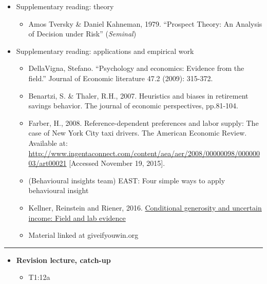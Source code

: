 \documentclass[]{article}
\providecommand{\tightlist}{%
  \setlength{\itemsep}{0pt}\setlength{\parskip}{0pt}}
\begin{document}
\begin{itemize}
\tightlist
\item
  Supplementary reading: theory

  \begin{itemize}
  \tightlist
  \item
    Amos Tversky \& Daniel Kahneman, 1979. ``Prospect Theory: An Analysis of Decision under Risk'' (\emph{Seminal})
  \end{itemize}
\item
  Supplementary reading: applications and empirical work

  \begin{itemize}
  \tightlist
  \item
    DellaVigna, Stefano. ``Psychology and economics: Evidence from the field.'' Journal of Economic literature 47.2 (2009): 315-372.
  \item
    Benartzi, S. \& Thaler, R.H., 2007. Heuristics and biases in retirement savings behavior. The journal of economic perspectives, pp.81-104.
  \item
    Farber, H., 2008. Reference-dependent preferences and labor supply: The case of New York City taxi drivers. The American Economic Review. Available at: \url{http://www.ingentaconnect.com/content/aea/aer/2008/00000098/00000003/art00021} {[}Accessed November 19, 2015{]}.
  \item
    (Behavioural insights team) EAST: Four simple ways to apply behavioural insight
  \item
    Kellner, Reinstein and Riener, 2016. \href{https://dl.dropboxusercontent.com/u/91553/Giving_and_Probability.pdf}{Conditional generosity and uncertain income: Field and lab evidence}
  \item
    Material linked at giveifyouwin.org
  \end{itemize}
\end{itemize}

\begin{center}\rule{0.5\linewidth}{\linethickness}\end{center}

\begin{itemize}
\tightlist
\item
  \textbf{Revision lecture, catch-up}

  \begin{itemize}
  \tightlist
  \item
    T1:12a
  \end{itemize}
\end{itemize}
\end{document}

